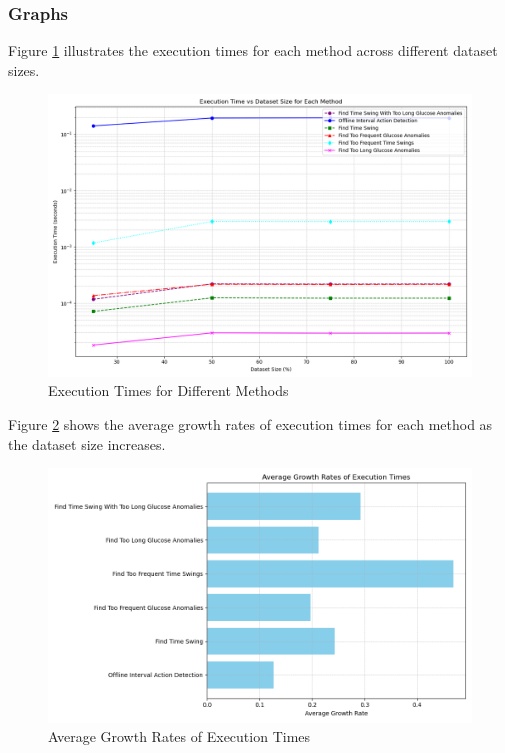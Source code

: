 \documentclass{article}
\begin{document}
\subsubsection{Graphs}

Figure \ref{fig:execution_times} illustrates the execution times for each method across different dataset sizes.

\begin{figure}[h!]
\centering
\includegraphics[width=01.0\textwidth]{Images/Graphs/execution_times.png}
\caption{Execution Times for Different Methods}
\label{fig:execution_times}
\end{figure}

\pagebreak

Figure \ref{fig:growth_rates} shows the average growth rates of execution times for each method as the dataset size increases.

\begin{figure}[h!]
\centering
\includegraphics[width=01.0\textwidth]{Images/Graphs/growth_rates.png}
\caption{Average Growth Rates of Execution Times}
\label{fig:growth_rates}
\end{figure}
\end{document}

